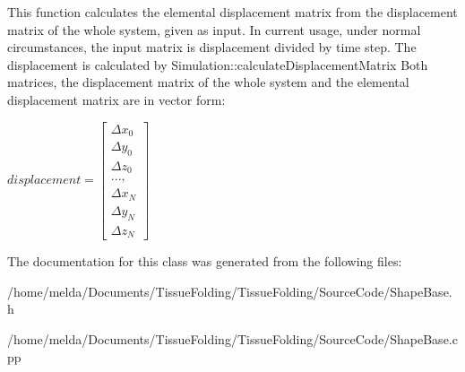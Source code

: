 This function calculates the elemental displacement matrix from the displacement matrix of the whole system, given as input. In current usage, under normal circumstances, the input matrix is displacement divided by time step. The displacement is calculated by Simulation\+::calculate\+Displacement\+Matrix Both matrices, the displacement matrix of the whole system and the elemental displacement matrix are in vector form\+:

$ displacement = \begin{bmatrix} \Delta x_{0}\\ \Delta y_{0}\\ \Delta z_{0}\\ ... ,\\ \Delta x_{N}\\ \Delta y_{N}\\ \Delta z_{N} \end{bmatrix} $

The documentation for this class was generated from the following files\+:\begin{DoxyCompactItemize}
\item 
/home/melda/\+Documents/\+Tissue\+Folding/\+Tissue\+Folding/\+Source\+Code/Shape\+Base.\+h\item 
/home/melda/\+Documents/\+Tissue\+Folding/\+Tissue\+Folding/\+Source\+Code/Shape\+Base.\+cpp\end{DoxyCompactItemize}
